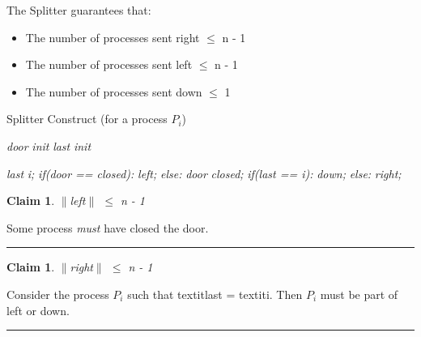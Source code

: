 \documentclass[twoside]{article}
\newtheorem{claim}[theorem]{Claim}
\newenvironment{proof}{{\bf Proof:}}{\hfill\rule{2mm}{2mm}}
\begin{document}
The Splitter guarantees that:

\begin{itemize}
  \item The number of processes sent right $\le$ n - 1
  \item The number of processes sent left $\le$ n - 1
  \item The number of processes sent down $\le$ 1
\end{itemize}

\begin{algorithm}
\caption{Splitter Construct (for a process ${P_i}$)}\label{splitterConstruct}
\begin{algorithmic}[1]
\State {} \textit{door}   \textit{init} 
\State {} \textit{last}   \textit{init} \newline

\State \textit{last} \text{=} \textit{i;}
\State \emph{if(door == closed):}
\Indent
	\State {} \textit{left;}
\EndIndent
\State \emph{else:}
\Indent
	\State \textit{door} \text{=} \textit{closed;}
    \State \emph{if(last == i):}  \textit{down;}
    \State \emph{else:}  \textit{right;}
\EndIndent
\end{algorithmic}
\end{algorithm}

\begin{claim}
$\|$left$\|$ $\le$ n - 1
\end{claim}
\begin{proof}
Some process \emph{must} have closed the door.
\end{proof}

\begin{claim}
$\|$right$\|$ $\le$ n - 1
\end{claim}
\begin{proof}
Consider the process ${P_i}$ such that textit{last} = textit{i}. Then ${P_i}$ must be  part of left or down.
\end{proof}
\end{document}
